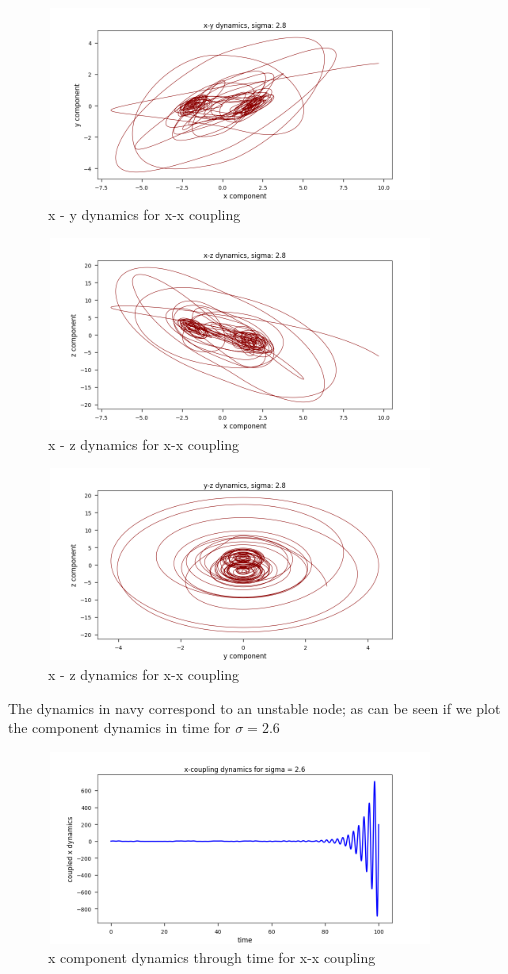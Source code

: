 \documentclass{article}
\begin{document}
\begin{figure}[H]
\centering
\includegraphics[width = 4in, height = 2in]{x_coupling_s28_xy.png}
\caption{x - y dynamics for x-x coupling}
\end{figure}

\begin{figure}[H]
\centering
\includegraphics[width = 4in, height = 2in]{x_coupling_s28_xz.png}
\caption{x - z dynamics for x-x coupling}
\end{figure}

\begin{figure}[H]
\centering
\includegraphics[width = 4in, height = 2in]{x_coupling_s28_zy.png}
\caption{x - z dynamics for x-x coupling}
\end{figure}

The dynamics in navy correspond
to an unstable node; as can be seen if we plot the component dynamics in time for $\sigma = 2.6$

\begin{figure}[H]
\centering
\includegraphics[width = 4in, height = 2in]{x_coupling_x_dynamics_s26.png}
\caption{x component dynamics through time for x-x coupling}
\end{figure}
\end{document}
